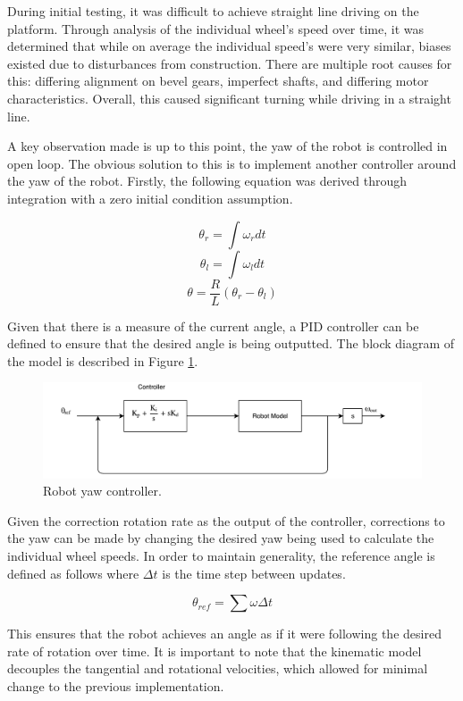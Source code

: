 \documentclass[ece]{uw-wkrpt}
\begin{document}
During initial testing, it was difficult to achieve straight line driving on the platform. Through analysis of the individual wheel's speed over time, it was determined that while on average the individual speed's were very similar, biases existed due to disturbances from construction. There are multiple root causes for this: differing alignment on bevel gears, imperfect shafts, and differing motor characteristics. Overall, this caused significant turning while driving in a straight line.

A key observation made is up to this point, the yaw of the robot is controlled in open loop. The obvious solution to this is to implement another controller around the yaw of the robot. Firstly, the following equation was derived through integration with a zero initial condition assumption.

\[\theta_r = \int\omega_rdt\]
\[\theta_l = \int\omega_ldt\]
\[\theta=\frac{R}{L}(\theta_r-\theta_l)\]

Given that there is a measure of the current angle, a PID controller can be defined to ensure that the desired angle is being outputted. The block diagram of the model is described in Figure \ref{fig:yawController}.

\begin{figure}
    \centering
    \includegraphics[width=5.5in]{res/yawController}
    \caption[Robot yaw controller]
          {Robot yaw controller.}
    \label{fig:yawController}
\end{figure}

Given the correction rotation rate as the output of the controller, corrections to the yaw can be made by changing the desired yaw being used to calculate the individual wheel speeds. In order to maintain generality, the reference angle is defined as follows where $\Delta t$ is the time step between updates. 

\[\theta_{ref} = \sum\omega \Delta t\]

This ensures that the robot achieves an angle as if it were following the desired rate of rotation over time. It is important to note that the kinematic model decouples the tangential and rotational velocities, which allowed for minimal change to the previous implementation. 
\end{document}
